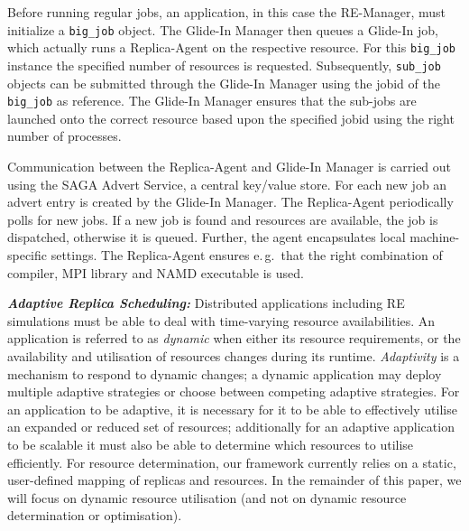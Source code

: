 \documentclass{rspublic}
\newcommand{\replicaagent}[1]{Replica-Agent }
\begin{document}
Before running regular jobs, an application, in this case the 
RE-Manager, must initialize a \texttt{big\_job} object. 
The Glide-In Manager then queues a Glide-In
job, which actually runs a Replica-Agent on the respective resource.  
For this \texttt{big\_job} instance the
specified number of resources is requested. Subsequently,
\texttt{sub\_job} objects can be submitted through the Glide-In
Manager using the jobid of the \texttt{big\_job} as reference.
The Glide-In Manager ensures that the sub-jobs are launched onto the 
correct resource based upon the specified jobid using the right number
of processes.

Communication between the Replica-Agent and Glide-In Manager is
carried out using the SAGA Advert Service, a central key/value
store. For each new job an advert entry is created by the
Glide-In Manager. The \replicaagent\ periodically polls for new jobs.  If a
new job is found and resources are available, the job is dispatched, 
otherwise it is queued. Further, the agent encapsulates
local machine-specific settings. The \replicaagent\
ensures e.\,g.\ that the right combination of compiler, MPI library and NAMD
executable is used.


{\noindent \it \bf Adaptive Replica Scheduling:} Distributed applications
including RE simulations must be able to deal with time-varying
resource availabilities.  An application is referred to as
\emph{dynamic} when either its resource requirements, 
or the availability and utilisation of resources 
changes during its runtime.  \emph{Adaptivity} is a
mechanism to respond to dynamic
changes; %
a dynamic application may deploy multiple adaptive strategies or
choose between competing adaptive strategies.  For an application to
be adaptive, it is necessary for it to be able to effectively
utilise an expanded or reduced set of resources; additionally for an
adaptive application to be scalable it must also be able to
determine which resources to utilise efficiently.
For resource determination, our framework currently relies on a
static, user-defined mapping of replicas and resources.  In the
remainder of this paper, we will focus on dynamic resource
utilisation (and not on dynamic resource determination or
optimisation).
\end{document}
